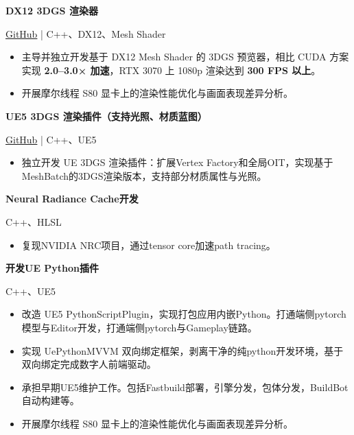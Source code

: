\documentclass[10pt,a4paper]{article}
\newcommand{\project}[1]{
    \par
    \vspace{5pt}
    {\fontsize{10}{10}\selectfont \bfseries \hspace{10pt} #1}
    \par}
\newcommand{\meta}[1]{
    \par
    \vspace{-5pt}
    {\color{muted}\fontsize{10}{10}\selectfont \hspace{10pt} #1}
    \par}
\begin{document}
    \newpage
    
    \project{\textbf{DX12 3DGS 渲染器}}
    \meta{\href{https://github.com/MooreThreads/TurboSplat-Viz}{GitHub} | C++、DX12、Mesh Shader}
    \begin{itemize}
    \item 主导并独立开发基于 DX12 Mesh Shader 的 3DGS 预览器，相比 CUDA 方案实现 \textbf{2.0–3.0× 加速}，RTX 3070 上 1080p 渲染达到 \textbf{300 FPS 以上}。
    \item 开展摩尔线程 S80 显卡上的渲染性能优化与画面表现差异分析。
    \end{itemize}
    
    \project{\textbf{UE5 3DGS 渲染插件（支持光照、材质蓝图）}}
    \meta{\href{https://github.com/liaoKM/3DGS-UE5-Plugin}{GitHub} | C++、UE5}
    \begin{itemize}
    \item 独立开发 UE 3DGS 渲染插件：扩展Vertex Factory和全局OIT，实现基于MeshBatch的3DGS渲染版本，支持部分材质属性与光照。
    \end{itemize}
    
    \project{\textbf{Neural Radiance Cache开发}}
    \meta{C++、HLSL}
    \begin{itemize}
    \item 复现NVIDIA NRC项目，通过tensor core加速path tracing。
    \end{itemize}
    
    \project{\textbf{开发UE Python插件}}
    \meta{C++、UE5}
    \begin{itemize}
    \item 改造 UE5 PythonScriptPlugin，实现打包应用内嵌Python。打通端侧pytorch模型与Editor开发，打通端侧pytorch与Gameplay链路。
    \item 实现 UePythonMVVM 双向绑定框架，剥离干净的纯python开发环境，基于双向绑定完成数字人前端驱动。
    \item 承担早期UE5维护工作。包括Fastbuild部署，引擎分发，包体分发，BuildBot自动构建等。
    \item 开展摩尔线程 S80 显卡上的渲染性能优化与画面表现差异分析。
    \end{itemize}
\end{document}
